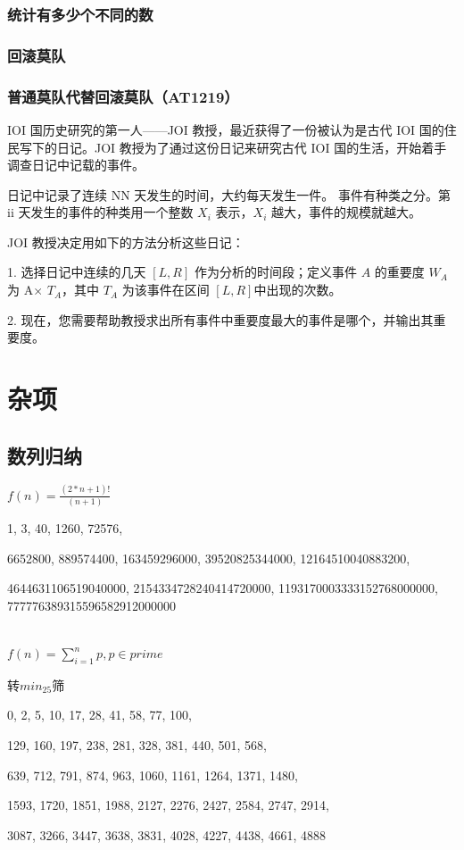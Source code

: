 \documentclass[twoside,a4paper]{article}
\begin{document}
\subsubsection{统计有多少个不同的数}

\subsubsection{回滚莫队}

\subsubsection{普通莫队代替回滚莫队（AT1219）}
IOI 国历史研究的第一人——JOI 教授，最近获得了一份被认为是古代 IOI 国的住民写下的日记。JOI 教授为了通过这份日记来研究古代 IOI 国的生活，开始着手调查日记中记载的事件。\par
日记中记录了连续 NN 天发生的时间，大约每天发生一件。
事件有种类之分。第 ii 天发生的事件的种类用一个整数 $X_i$ 表示，$X_i$ 越大，事件的规模就越大。\par
JOI 教授决定用如下的方法分析这些日记：\par
1. 选择日记中连续的几天 $[L,R]$ 作为分析的时间段；定义事件 $A$ 的重要度 $W_A$​ 为 A× $T_{A}$，其中 $T_A$ 为该事件在区间 $[L,R]$中出现的次数。\par
2. 现在，您需要帮助教授求出所有事件中重要度最大的事件是哪个，并输出其重要度。


\section{杂项}

\subsection{数列归纳}

$f(n) = \frac{(2*n + 1)!}{(n + 1)}$\par
1, 3, 40, 1260, 72576, \par
6652800, 889574400, 163459296000, 39520825344000, 12164510040883200, \par
4644631106519040000, 2154334728240414720000, 1193170003333152768000000, 777776389315596582912000000\par

~\\

$f(n) = \sum_{i=1}^{n} p, p \in prime$\par
转$min_25筛$\par
0, 2, 5, 10, 17, 28, 41, 58, 77, 100, \par
129, 160, 197, 238, 281, 328, 381, 440, 501, 568, \par
639, 712, 791, 874, 963, 1060, 1161, 1264, 1371, 1480, \par
1593, 1720, 1851, 1988, 2127, 2276, 2427, 2584, 2747, 2914, \par
3087, 3266, 3447, 3638, 3831, 4028, 4227, 4438, 4661, 4888\par
\par
\end{document}
